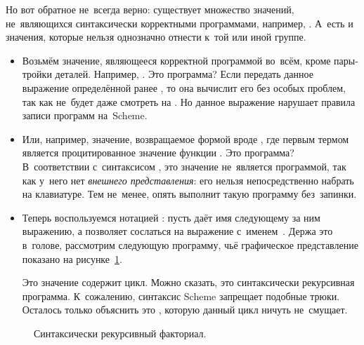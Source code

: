Но вот обратное не~всегда верно: существует множество значений, не~являющихся
синтаксически корректными программами, например, . А~есть и
значения, которые нельзя однозначно отнести к~той или иной группе.

\begin{itemize}
  \item Возьмём значение, являющееся корректной программой во~всём,
        кроме пары-тройки деталей. Например, .
        Это программа? Если передать данное выражение определённой ранее
        , то она вычислит его без особых проблем, так как не~будет
        даже смотреть на . Но данное выражение нарушает
        правила записи программ на~Scheme.

  \item {}
        Или, например, значение, возвращаемое формой вроде , где первым термом является процитированное значение
        функции . Это программа? В~соответствии с~синтаксисом
        \RnRS, это значение не~является программой, так как у~него нет
        \emph{внешнего представления}: его нельзя непосредственно набрать
        на клавиатуре. Тем не~менее,  опять выполнит такую
        программу без~запинки.

  \item %
        Теперь воспользуемся нотацией {\CommonLisp}: пусть 
        даёт имя следующему за ним выражению, а  позволяет
        сослаться на выражение с~именем~. Держа это в~голове,
        рассмотрим следующую программу, чьё графическое представление
        показано на рисунке~\ref{reflection/prog-and-val/pic:recusive}.
        Это значение содержит цикл. Можно сказать, это синтаксически
        рекурсивная программа. К~сожалению, синтаксис Scheme запрещает
        подобные трюки. Осталось только объяснить это , которую
        данный цикл ничуть не~смущает.
\end{itemize}

\begin{figure}\begin{center}

\end{center}%
\caption{Синтаксически рекурсивный факториал.}%
\label{reflection/prog-and-val/pic:recusive}
\end{figure}

